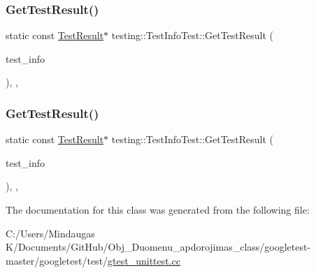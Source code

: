 \subsubsection{\texorpdfstring{GetTestResult()}{GetTestResult()}\hspace{0.1cm}{\footnotesize\ttfamily [2/3]}}
{\footnotesize\ttfamily static const \mbox{\hyperlink{classtesting_1_1_test_result}{Test\+Result}}$\ast$ testing\+::\+Test\+Info\+Test\+::\+Get\+Test\+Result (\begin{DoxyParamCaption}\item[{const \mbox{\hyperlink{classtesting_1_1_test_info}{Test\+Info}} $\ast$}]{test\+\_\+info }\end{DoxyParamCaption})\hspace{0.3cm}{\ttfamily [inline]}, {\ttfamily [static]}, {\ttfamily [protected]}}

\mbox{\label{classtesting_1_1_test_info_test_a154b3679b1aa00ad037ce46eb60d18c3}} 
\subsubsection{\texorpdfstring{GetTestResult()}{GetTestResult()}\hspace{0.1cm}{\footnotesize\ttfamily [3/3]}}
{\footnotesize\ttfamily static const \mbox{\hyperlink{classtesting_1_1_test_result}{Test\+Result}}$\ast$ testing\+::\+Test\+Info\+Test\+::\+Get\+Test\+Result (\begin{DoxyParamCaption}\item[{const \mbox{\hyperlink{classtesting_1_1_test_info}{Test\+Info}} $\ast$}]{test\+\_\+info }\end{DoxyParamCaption})\hspace{0.3cm}{\ttfamily [inline]}, {\ttfamily [static]}, {\ttfamily [protected]}}



The documentation for this class was generated from the following file\+:\begin{DoxyCompactItemize}
\item 
C\+:/\+Users/\+Mindaugas K/\+Documents/\+Git\+Hub/\+Obj\+\_\+\+Duomenu\+\_\+apdorojimas\+\_\+class/googletest-\/master/googletest/test/\mbox{\hyperlink{googletest-master_2googletest_2test_2gtest__unittest_8cc}{gtest\+\_\+unittest.\+cc}}\end{DoxyCompactItemize}
